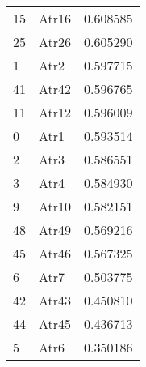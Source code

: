 \begin{tabular}{llr}
15 & Atr16 & 0.608585 \\
25 & Atr26 & 0.605290 \\
1 & Atr2 & 0.597715 \\
41 & Atr42 & 0.596765 \\
11 & Atr12 & 0.596009 \\
0 & Atr1 & 0.593514 \\
2 & Atr3 & 0.586551 \\
3 & Atr4 & 0.584930 \\
9 & Atr10 & 0.582151 \\
48 & Atr49 & 0.569216 \\
45 & Atr46 & 0.567325 \\
6 & Atr7 & 0.503775 \\
42 & Atr43 & 0.450810 \\
44 & Atr45 & 0.436713 \\
5 & Atr6 & 0.350186 \\
\bottomrule
\end{tabular}
